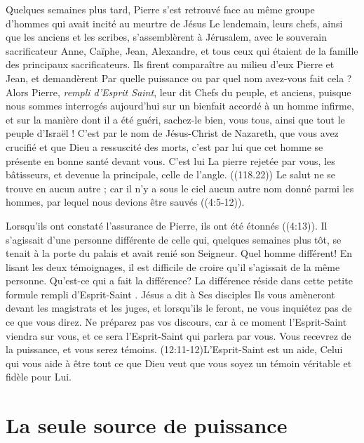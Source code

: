 Quelques semaines plus tard, Pierre s'est retrouvé face au même groupe
 d'hommes qui avait incité au meurtre de Jésus\frcolon{}
 \Og Le lendemain, leurs chefs, ainsi que les anciens et les scribes,
 s'assemblèrent à Jérusalem, avec le souverain sacrificateur Anne,
 Caïphe, Jean, Ale\-xandre, et tous ceux qui étaient de la famille
 des principaux sacrificateurs. Ils firent comparaître au milieu d'eux
 Pierre et Jean, et demandèrent\frcolon{} Par quelle puissance ou par quel nom
 avez-vous fait cela ? Alors Pierre, \emph{rempli d'Esprit Saint}, leur dit\frcolon{}
 Chefs du peuple, et anciens, puisque nous sommes interrogés aujourd'hui
 sur un bienfait accordé à un homme infirme, et sur la manière
 dont il a été guéri, sachez-le bien, vous tous, ainsi que tout le peuple
 d'Israël ! C'est par le nom de Jésus-Christ de Nazareth, que vous avez
 crucifié et que Dieu a ressuscité des morts, c'est par lui que cet homme
 se présente en bonne santé devant vous. C'est lui\frcolon{} \Og La pierre rejetée
 par vous, les bâtisseurs, et devenue la principale, celle de l'angle. \Fg{} ((118.22))
 Le salut ne se trouve en aucun autre ; car il n'y a sous le ciel aucun
 autre nom donné parmi les hommes, par lequel nous devions être
 sauvés \Fg{} ((4:5-12)).

Lorsqu'ils ont constaté l'assurance de Pierre, ils ont été étonnés
 ((4:13)).
 Il s'agissait d'une personne différente
 de celle qui, quelques semaines plus tôt, se tenait à la porte du palais
 et avait renié son Seigneur. Quel homme différent!
 En lisant les deux témoignages, il est difficile de croire
 qu'il s'agissait de la même personne. Qu'est-ce qui a fait la différence?
 La différence réside dans cette petite formule\frcolon{}
 \Og rempli d'Esprit-Saint \Fg{}. Jésus a dit à Ses disciples\frcolon{}
 \Og Ils vous amèneront devant les magistrats et les juges,
 et lorsqu'ils le feront, ne vous inquiétez pas de ce que vous direz.
 Ne préparez pas vos discours, car à ce moment l'Esprit-Saint viendra
 sur vous, et ce sera l'Esprit-Saint qui parlera par vous.
 Vous recevrez de la puissance, et vous serez témoins. \Fg{}
 (12:11-12)L'Esprit-Saint est un aide,
 Celui qui vous aide à être tout ce que Dieu
 veut que vous soyez\frcolon{} un témoin véritable et fidèle pour Lui.


\section{La seule source de puissance}

